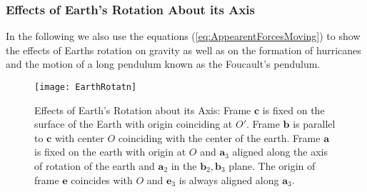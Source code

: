 \documentclass[graybox,envcountchap,sectrefs]{svmonoMuga}
\begin{document}
\subsubsection{Effects of Earth's Rotation About its Axis}\label{Secn:EffectOfEarthRotation}
In the following we also use the equations (\ref{eq:AppearentForcesMoving}) to show the effects of Earths rotation on gravity as well as on the 
formation of hurricanes and the motion of a long pendulum known as the Foucault's pendulum. 

\begin{figure}[ht]
\begin{center}
\texttt{[image: EarthRotatn]}
\renewcommand{\baselinestretch}{1}\selectfont
\caption{Effects of Earth's Rotation about its Axis: Frame $\mathbf{c}$ is fixed on the surface of the Earth with origin coinciding at $O'$. Frame $\mathbf{b}$ is parallel to $\mathbf{c}$ with center $O$ coinciding 
with the center of the earth. Frame $\mathbf{a}$ is fixed on the earth with origin at $O$ and $\mathbf{a}_3$ aligned along the axis of rotation of the earth and $\mathbf{a}_2$ in the $\mathbf{b}_2,\mathbf{b}_3$ plane. The origin of frame $\mathbf{e}$ coincides with $O$ 
and $\mathbf{e}_3$ is always aligned along $\mathbf{a}_3$.}
\label{Fig:EarthRotan}
\renewcommand{\baselinestretch}{1.5}\selectfont
\end{center}
\end{figure}
\end{document}
